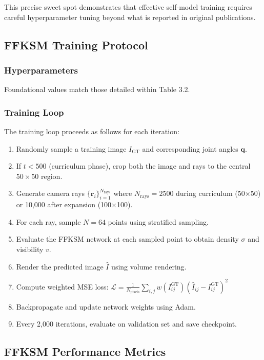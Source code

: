 \documentclass[12pt,a4paper,oneside]{report}
\begin{document}
This precise sweet spot demonstrates that effective self-model training requires careful hyperparameter tuning beyond what is reported in original publications.

\subsection{FFKSM Training Protocol}

\subsubsection{Hyperparameters}

Foundational values match those detailed within Table 3.2.

\subsubsection{Training Loop}

The training loop proceeds as follows for each iteration:

\begin{enumerate}
    \item Randomly sample a training image $I_{\text{GT}}$ and corresponding joint angles $\mathbf{q}$.
    \item If $t < 500$ (curriculum phase), crop both the image and rays to the central $50 \times 50$ region.
    \item Generate camera rays $\{\mathbf{r}_i\}_{i=1}^{N_{\text{rays}}}$ where $N_{\text{rays}} = 2500$ during curriculum (50$\times$50) or 10,000 after expansion (100$\times$100).
    \item For each ray, sample $N=64$ points using stratified sampling.
    \item Evaluate the FFKSM network at each sampled point to obtain density $\sigma$ and visibility $v$.
    \item Render the predicted image $\hat{I}$ using volume rendering.
    \item Compute weighted MSE loss: $\mathcal{L} = \frac{1}{N_{\text{pixels}}} \sum_{i,j} w(I_{ij}^{\text{GT}}) (\hat{I}_{ij} - I_{ij}^{\text{GT}})^2$
    \item Backpropagate and update network weights using Adam.
    \item Every 2,000 iterations, evaluate on validation set and save checkpoint.
\end{enumerate}

\subsection{FFKSM Performance Metrics}
\end{document}

